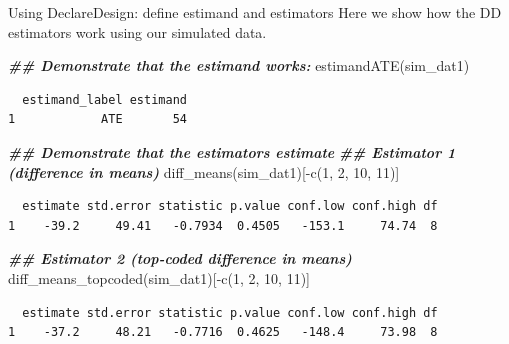 \documentclass[
  ignorenonframetext,
]{beamer}
\newenvironment{Shaded}{\begin{snugshade}}{\end{snugshade}}
\newcommand{\DecValTok}[1]{\textcolor[rgb]{0.00,0.00,0.81}{#1}}
\newcommand{\DocumentationTok}[1]{\textcolor[rgb]{0.56,0.35,0.01}{\textbf{\textit{#1}}}}
\newcommand{\FunctionTok}[1]{\textcolor[rgb]{0.00,0.00,0.00}{#1}}
\newcommand{\NormalTok}[1]{#1}
\newcommand{\SpecialCharTok}[1]{\textcolor[rgb]{0.00,0.00,0.00}{#1}}
\begin{document}
\begin{frame}[fragile]{Using DeclareDesign: define estimand and
estimators}
\protect\hypertarget{using-declaredesign-define-estimand-and-estimators-2}{}
Here we show how the DD estimators work using our simulated data.

\scriptsize

\begin{Shaded}
\begin{Highlighting}[]
\DocumentationTok{\#\# Demonstrate that the estimand works:}
\FunctionTok{estimandATE}\NormalTok{(sim\_dat1)}
\end{Highlighting}
\end{Shaded}

\begin{verbatim}
  estimand_label estimand
1            ATE       54
\end{verbatim}

\begin{Shaded}
\begin{Highlighting}[]
\DocumentationTok{\#\# Demonstrate that the estimators estimate}
\DocumentationTok{\#\# Estimator 1 (difference in means)}
\FunctionTok{diff\_means}\NormalTok{(sim\_dat1)[}\SpecialCharTok{{-}}\FunctionTok{c}\NormalTok{(}\DecValTok{1}\NormalTok{, }\DecValTok{2}\NormalTok{, }\DecValTok{10}\NormalTok{, }\DecValTok{11}\NormalTok{)]}
\end{Highlighting}
\end{Shaded}

\begin{verbatim}
  estimate std.error statistic p.value conf.low conf.high df
1    -39.2     49.41   -0.7934  0.4505   -153.1     74.74  8
\end{verbatim}

\begin{Shaded}
\begin{Highlighting}[]
\DocumentationTok{\#\# Estimator 2 (top{-}coded difference in means)}
\FunctionTok{diff\_means\_topcoded}\NormalTok{(sim\_dat1)[}\SpecialCharTok{{-}}\FunctionTok{c}\NormalTok{(}\DecValTok{1}\NormalTok{, }\DecValTok{2}\NormalTok{, }\DecValTok{10}\NormalTok{, }\DecValTok{11}\NormalTok{)]}
\end{Highlighting}
\end{Shaded}

\begin{verbatim}
  estimate std.error statistic p.value conf.low conf.high df
1    -37.2     48.21   -0.7716  0.4625   -148.4     73.98  8
\end{verbatim}

\normalsize
\end{frame}
\end{document}

